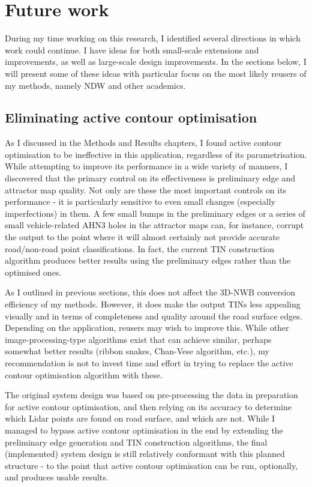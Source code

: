 \section{Future work}
\label{sec:futurework}

During my time working on this research, I identified several directions in which work could continue. I have ideas for both small-scale extensions and improvements, as well as large-scale design improvements. In the sections below, I will present some of these ideas with particular focus on the most likely reusers of my methods, namely NDW and other academics.

\subsection{Eliminating active contour optimisation}
\label{sub:improvementsactivecontours}

As I discussed in the Methods and Results chapters, I found active contour optimisation to be ineffective in this application, regardless of its parametrisation. While attempting to improve its performance in a wide variety of manners, I discovered that the primary control on its effectiveness is preliminary edge and attractor map quality. Not only are these the most important controls on its performance - it is particularly sensitive to even small changes (especially imperfections) in them. A few small bumps in the preliminary edges or a series of small vehicle-related AHN3 holes in the attractor maps can, for instance, corrupt the output to the point where it will almost certainly not provide accurate road/non-road point classifications. In fact, the current TIN construction algorithm produces better results using the preliminary edges rather than the optimised ones.

As I outlined in previous sections, this does not affect the 3D-NWB conversion efficiency of my methods. However, it does make the output TINs less appealing visually and in terms of completeness and quality around the road surface edges. Depending on the application, reusers may wish to improve this. While other image-processing-type algorithms exist that can achieve similar, perhaps somewhat better results (ribbon snakes, Chan-Vese algorithm, etc.), my recommendation is not to invest time and effort in trying to replace the active contour optimisation algorithm with these.

The original system design was based on pre-processing the data in preparation for active contour optimisation, and then relying on its accuracy to determine which Lidar points are found on road surface, and which are not. While I managed to bypass active contour optimisation in the end by extending the preliminary edge generation and TIN construction algorithms, the final (implemented) system design is still relatively conformant with this planned structure - to the point that active contour optimisation can be run, optionally, and produces usable results.

